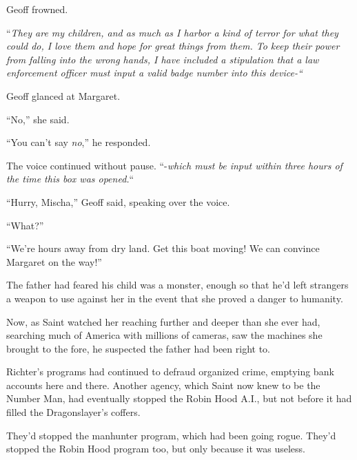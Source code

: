 Geoff frowned.



``\emph{They are my children, and as much as I harbor a kind of terror for what they could do, I love them and hope for great things from them.  To keep their power from falling into the wrong hands, I have included a stipulation that a law enforcement officer must input a valid badge number into this device-``}



Geoff glanced at Margaret.



``No,'' she said.



``You can't say \emph{no},'' he responded.



The voice continued without pause.  ``-\emph{which must be input within three hours of the time this box was opened.}``



``Hurry, Mischa,'' Geoff said, speaking over the voice.



``What?''



``We're hours away from dry land.  Get this boat moving!  We can convince Margaret on the way!''



\blacksquare



The father had feared his child was a monster, enough so that he'd left strangers a weapon to use against her in the event that she proved a danger to humanity.



Now, as Saint watched her reaching further and deeper than she ever had, searching much of America with millions of cameras, saw the machines she brought to the fore, he suspected the father had been right to.



Richter's programs had continued to defraud organized crime, emptying bank accounts here and there.  Another agency, which Saint now knew to be the Number Man, had eventually stopped the Robin Hood A.I., but not before it had filled the Dragonslayer's coffers.



They'd stopped the manhunter program, which had been going rogue.  They'd stopped the Robin Hood program too, but only because it was useless.



